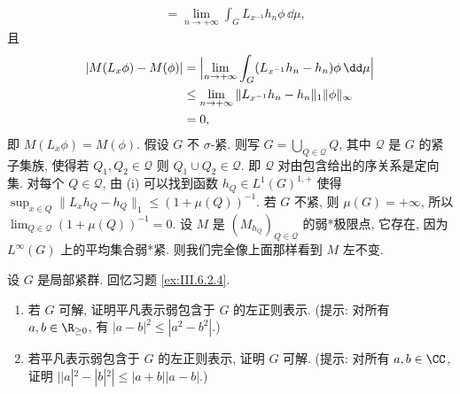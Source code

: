 \begin{solution}
\begin{align*}
&= \lim_{n \to +\infty}\int_G L_{x^{-1}}h_n\phi\,\dd\mu,
\end{align*}
且
\begin{align*}
|M(L_x\phi) - M(\phi)| &= \Bigl|\lim_{n \to +\infty}\int_G (L_{x^{-1}}h_n - h_n)\phi\,\dd\mu\Bigr| \\
&\leq \lim_{n \to +\infty}\|L_{x^{-1}}h_n - h_n\|_1\|\phi\|_{\infty} \\
&= 0,
\end{align*}
即 $M(L_x\phi) = M(\phi)$.
假设 $G$ 不 $\sigma$-紧. 则写 $G = \bigcup_{Q \in \mathcal{Q}}Q$, 其中 $\mathcal{Q}$ 是 $G$ 的紧子集族, 使得若 $Q_1, Q_2 \in \mathcal{Q}$ 则 $Q_1 \cup Q_2 \in \mathcal{Q}$. 即 $\mathcal{Q}$ 对由包含给出的序关系是定向集. 对每个 $Q \in \mathcal{Q}$, 由 (i) 可以找到函数 $h_Q \in L^1(G)^{1,+}$ 使得 $\sup_{x \in Q}\|L_xh_Q - h_Q\|_1 \leq (1 + \mu(Q))^{-1}$. 若 $G$ 不紧, 则 $\mu(G) = +\infty$, 所以 $\lim_{Q \in \mathcal{Q}}(1 + \mu(Q))^{-1} = 0$. 设 $M$ 是 $(M_{h_Q})_{Q \in \mathcal{Q}}$ 的弱*极限点, 它存在, 因为 $L^{\infty}(G)$ 上的平均集合弱*紧. 则我们完全像上面那样看到 $M$ 左不变.
\end{solution}

\begin{exercise}[可解性与平凡表示的弱包含]
\label{ex:III.6.3.4}
设 $G$ 是局部紧群. 回忆习题 \ref{ex:III.6.2.4}.
\begin{enumerate}
\item[(a)] 若 $G$ 可解, 证明平凡表示弱包含于 $G$ 的左正则表示. (提示: 对所有 $a, b \in \R_{\geq 0}$, 有 $|a - b|^2 \leq |a^2 - b^2|$.)
\item[(b)] 若平凡表示弱包含于 $G$ 的左正则表示, 证明 $G$ 可解. (提示: 对所有 $a, b \in \CC$, 证明 $||a|^2 - |b|^2| \leq |a + b||a - b|$.)
\end{enumerate}
\end{exercise}


